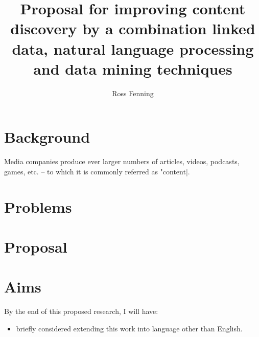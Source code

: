\documentclass[10pt,a4paper]{article}
\title{Proposal for improving content discovery by a combination linked data, natural language processing and data mining techniques}
\author{Ross Fenning}
\begin{document}
\maketitle
\thispagestyle{empty}

\section{Background}

Media companies produce ever larger numbers of articles, videos, podcasts, games, etc.
-- to which it is commonly referred as "content|.

\section{Problems}

\section{Proposal}

\section{Aims}

By the end of this proposed research, I will have:

\begin{itemize}
\item briefly considered extending this work into language other than English.
\end{itemize}
\end{document}
